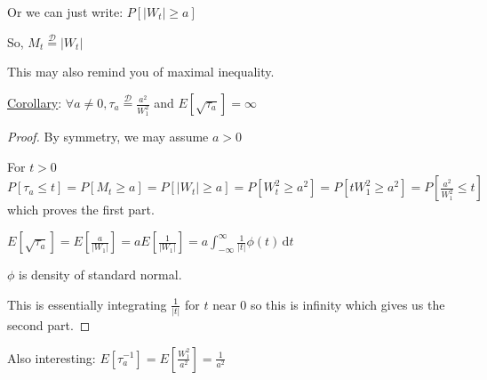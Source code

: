 \documentclass{article}
\theoremstyle{definition}
\begin{document}
Or we can just write: \(P[\vert W_t \vert \geq a]\) 

So, \(M_t \overset{\mathscr{D}}{=} \vert W_t\vert \) 

This may also remind you of maximal inequality.

\underline{Corollary}: \(\forall a\neq 0, \tau_a \overset{\mathscr{D}}{=} \frac{a^2}{W_1^2} \) and \(E[\sqrt{\tau_a}]=\infty\)

\begin{proof}
    By symmetry, we may assume \(a > 0\) 

    For \(t > 0\) \(P[\tau_a \leq t] = P[M_t \geq a] = P[\vert W_t \vert \geq a] = P[W_t^2 \geq a^2] = P[t W_1^2 \geq a^2] = P[\frac{a^2}{W_1^2}\leq t]\) which proves the first part.

    \(E[\sqrt{\tau_a}] = E[\frac{a}{\vert W_1 \vert }] = a E[\frac{1}{\vert W_1 \vert}] = a \int_{-\infty}^{\infty} \frac{1}{\vert t \vert} \phi(t) \,\mathrm{d}t \) 

    \(\phi\) is density of standard normal. 

    This is essentially integrating \(\frac{1}{\vert t \vert}\) for \(t\) near \(0\) so this is infinity which gives us the second part. 

\end{proof}

Also interesting: \(E[\tau_a ^{-1}]=E[\frac{W_1^2}{a^2}]=\frac{1}{a^2}\) 
\end{document}
